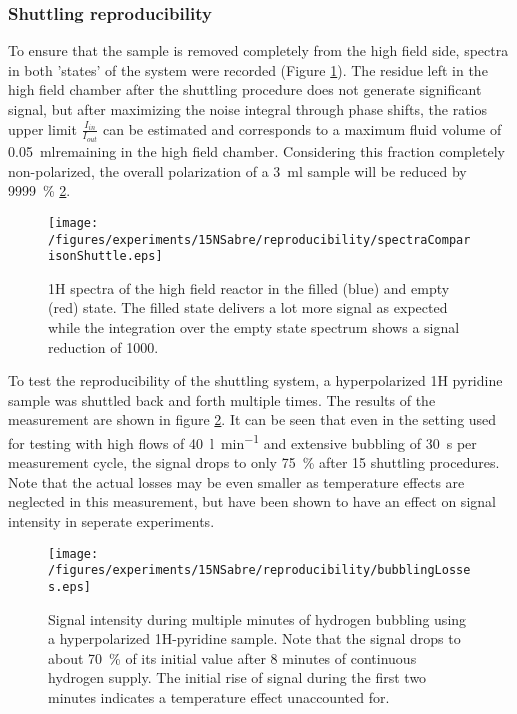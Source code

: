         \subsubsection{Shuttling reproducibility}
        \label{results:15N:shuttlingReproducibility}
            To ensure that the sample is removed completely from the high field side, spectra in both 'states' of the system were recorded (Figure \ref{fig:results:15N:shuttlingRemoval}). The residue left in the high field chamber after the shuttling procedure does not generate significant signal, but after maximizing the noise integral through phase shifts, the ratios upper limit $\frac{I_{in}}{I_{out}}$ can be estimated and corresponds to a maximum fluid volume of \SI{0.05}{ml}remaining in the high field chamber. Considering this fraction completely non-polarized, the overall polarization of a \SI{3}{ml} sample will be reduced by \SI{9999}{\percent} \ref{fig:results:15N:shuttlingReproducibility}.
            \begin{figure}
                \centering
                \texttt{[image: /figures/experiments/15NSabre/reproducibility/spectraComparisonShuttle.eps]}
                \caption[High field removal efficiency]{1H spectra of the high field reactor in the filled (blue) and empty (red) state. The filled state delivers a lot more signal as expected while the integration over the empty state spectrum shows a signal reduction of 1000.}
                \label{fig:results:15N:shuttlingRemoval}
            \end{figure}
            To test the reproducibility of the shuttling system, a hyperpolarized 1H pyridine sample was shuttled back and forth multiple times. The results of the measurement are shown in figure \ref{fig:results:15N:shuttlingReproducibility}. It can be seen that even in the setting used for testing with high flows of \SI{40}{\litre\per\minute} and extensive bubbling of \SI{30}{\second} per measurement cycle, the signal drops to only \SI{75}{\percent} after 15 shuttling procedures. Note that the actual losses may be even smaller as temperature effects are neglected in this measurement, but have been shown to have an effect on signal intensity in seperate experiments.
            \begin{figure}
                \label{fig:results:15N:shuttlingReproducibility}
                \centering
                \texttt{[image: /figures/experiments/15NSabre/reproducibility/bubblingLosses.eps]}
                \caption[Bubbling fluid losses]{Signal intensity during multiple minutes of hydrogen bubbling using a hyperpolarized 1H-pyridine sample. Note that the signal drops to about \SI{70}{\percent} of its initial value after 8 minutes of continuous hydrogen supply. The initial rise of signal during the first two minutes indicates a temperature effect unaccounted for.}
            \end{figure}
